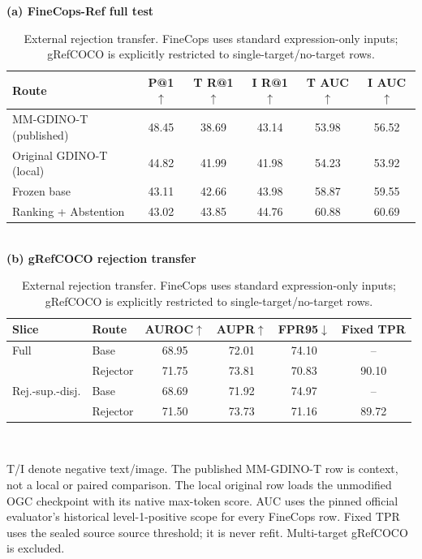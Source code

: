 \begin{table}[t]
\centering
\caption{External rejection transfer. FineCops uses standard expression-only
inputs; gRefCOCO is explicitly restricted to single-target/no-target rows.}
\label{tab:external}
\textbf{(a) FineCops-Ref full test}\\[2pt]
\scriptsize
\setlength{\tabcolsep}{1.0pt}
\begin{tabular}{lccccc}
\toprule
Route & P@1$\uparrow$ & T R@1$\uparrow$ & I R@1$\uparrow$ & T AUC$\uparrow$ & I AUC$\uparrow$ \\
\midrule
MM-GDINO-T (published) & 48.45 & 38.69 & 43.14 & 53.98 & 56.52 \\
Original GDINO-T (local) & 44.82 & 41.99 & 41.98 & 54.23 & 53.92 \\
Frozen base & 43.11 & 42.66 & 43.98 & 58.87 & 59.55 \\
Ranking + Abstention & 43.02 & 43.85 & 44.76 & 60.88 & 60.69 \\
\bottomrule
\end{tabular}
\\[5pt]
\textbf{(b) gRefCOCO rejection transfer}\\[2pt]
\scriptsize
\begin{tabular}{llcccc}
\toprule
Slice & Route & AUROC$\uparrow$ & AUPR$\uparrow$ & FPR95$\downarrow$ & Fixed TPR \\
\midrule
Full & Base & 68.95 & 72.01 & 74.10 & -- \\
 & Rejector & 71.75 & 73.81 & 70.83 & 90.10 \\
Rej.-sup.-disj. & Base & 68.69 & 71.92 & 74.97 & -- \\
 & Rejector & 71.50 & 73.73 & 71.16 & 89.72 \\
\bottomrule
\end{tabular}
\\[-1pt]
\parbox{0.98\columnwidth}{\scriptsize T/I denote negative text/image.
The published MM-GDINO-T row is context, not a local or paired comparison.
The local original row loads the unmodified OGC checkpoint with its native
max-token score.  AUC uses the pinned official evaluator's historical
level-1-positive scope for every FineCops row. Fixed TPR uses the sealed source
source threshold; it is never refit. Multi-target gRefCOCO is excluded.}
\end{table}
